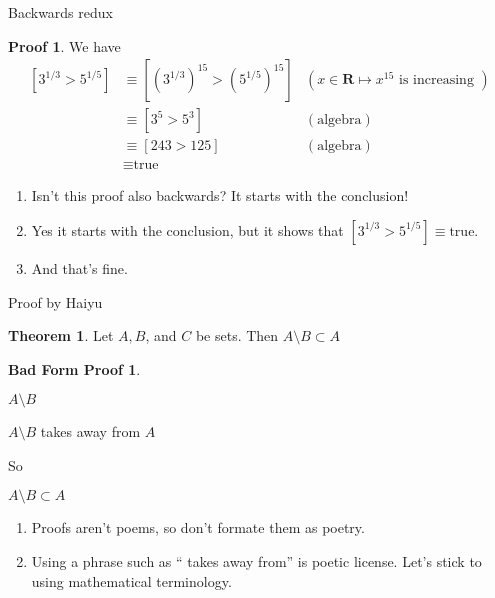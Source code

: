 \documentclass[fleqn]{beamer}
\newcommand{\reals}{\mathbf{R}}
\theoremstyle{definition}
\newtheorem{myth}{Theorem}
\newtheorem{myproof}{Proof}
\newtheorem{mybadformproof}{Bad Form Proof}
\begin{document}
\begin{frame}{Backwards redux}


\begin{myproof}
We have
\begin{align*}
   \left[   3^{1/3} > 5^{1/5} \right]  &\equiv \left[   (3^{1/3})^{15} > (5^{1/5})^{15}  \right]    & ( x \in \reals \mapsto x^{15} \mbox{ is  increasing } )\\
                                                               &\equiv  \left[ 3^5> 5^3 \right]   &(\mbox{algebra} ) \\
                                                                   &\equiv  \left[ 243 > 125 \right]   &(\mbox{algebra} ) \\
                                                                   &\equiv  \mbox{true}
  \end{align*}
\end{myproof}
\begin{enumerate}

\item Isn't this proof also backwards? It starts with the conclusion!

\item Yes it starts with the conclusion, but it shows that   \(    \left[   3^{1/3} > 5^{1/5} \right]    \equiv  \mbox{true} \).

\item And that's fine.
\end{enumerate}
\end{frame}

\begin{frame}{Proof by Haiyu}

\begin{myth}  Let \(A,B\), and \(C\) be sets.  Then \(A \setminus B \subset A\)  \end{myth}

\begin{mybadformproof}
   \begin{center}  \( A \setminus B \) \end{center}

     \begin{center}  \( A \setminus B \)  takes away from \(A\) \end{center}

     \begin{center}  So   \end{center}

     \begin{center}    \(A \setminus B \subset A\)  \end{center}

\end{mybadformproof}

\begin{enumerate}

\item Proofs aren't poems, so don't formate them as poetry.

\item Using a phrase such as `` takes away from'' is poetic license.  Let's stick to using mathematical terminology.
\end{enumerate}
\end{frame}
\end{document}
